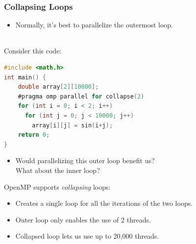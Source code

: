 \begin{frame}[fragile]
  \frametitle{Collapsing Loops}


  \begin{itemize}
    \item Normally, it's best to parallelize the outermost loop.
  \end{itemize}

  

  ~\\
  Consider this code:

  \begin{lstlisting}[language=C,morekeywords={foreach,pragma,omp,parallel,single,nowait,task,untied,barrier,taskyield}]
#include <math.h>
int main() {
    double array[2][10000];
    #pragma omp parallel for collapse(2)
    for (int i = 0; i < 2; i++)
      for (int j = 0; j < 10000; j++)
        array[i][j] = sin(i+j);
    return 0;
}
  \end{lstlisting}


  \begin{itemize}
  \item Would parallelizing this outer loop benefit us?\\
    What about the inner loop?
  \end{itemize}

  OpenMP supports \emph{collapsing} loops:

  \begin{itemize}
    \item Creates a single loop for all the iterations of the two loops.
    \item Outer loop only enables the use of 2 threads.
    \item Collapsed loop lets us use up to 20,000 threads.
  \end{itemize}
  

\end{frame}


